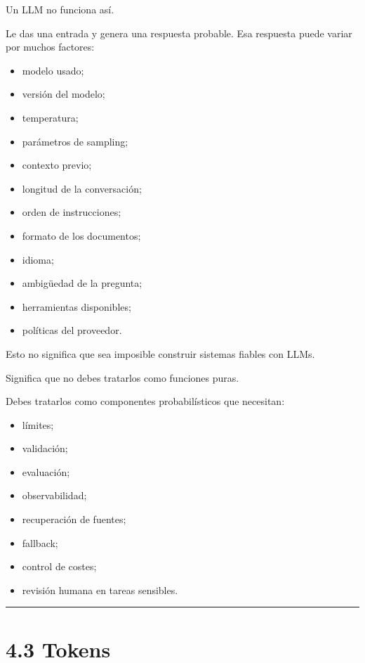 Un LLM no funciona así.

Le das una entrada y genera una respuesta probable. Esa respuesta puede
variar por muchos factores:

\begin{itemize}
\tightlist
\item
  modelo usado;
\item
  versión del modelo;
\item
  temperatura;
\item
  parámetros de sampling;
\item
  contexto previo;
\item
  longitud de la conversación;
\item
  orden de instrucciones;
\item
  formato de los documentos;
\item
  idioma;
\item
  ambigüedad de la pregunta;
\item
  herramientas disponibles;
\item
  políticas del proveedor.
\end{itemize}

Esto no significa que sea imposible construir sistemas fiables con LLMs.

Significa que no debes tratarlos como funciones puras.

Debes tratarlos como componentes probabilísticos que necesitan:

\begin{itemize}
\tightlist
\item
  límites;
\item
  validación;
\item
  evaluación;
\item
  observabilidad;
\item
  recuperación de fuentes;
\item
  fallback;
\item
  control de costes;
\item
  revisión humana en tareas sensibles.
\end{itemize}

\begin{center}\rule{0.5\linewidth}{0.5pt}\end{center}

\section{4.3 Tokens}\label{tokens}

